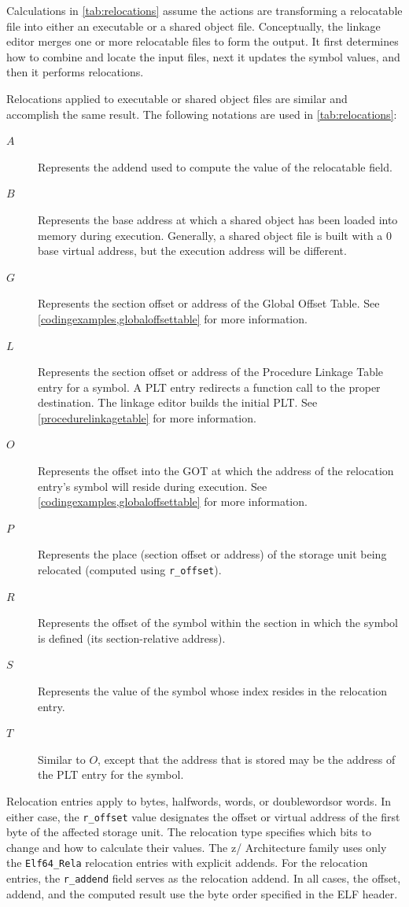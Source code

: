 \documentclass[USenglish,fontsize=11pt,twoside,%
  toc=bib,toc=idx,toc=graduated,numbers=noendperiod,
  bookmarks=true,
  bookmarksnumbered=true,
  bookmarksopen=true,
  bookmarksopenlevel=1,
  breaklinks=true,
  colorlinks=true,
  linkcolor=black,
  pdfpagelayout={TwoPageRight},
  pdfusetitle=true
]{scrreprt}
\newcommand{\NBITS}{64}
\newcommand{\ARCH}{z/\kern-1pt Ar\-chi\-tec\-ture}
\newcommand{\NBITS}{32}
\newcommand{\ARCH}{ESA/390}
\begin{document}
Calculations in \cref{tab:relocations} assume the actions are
transforming a relocatable file into either an executable or a shared
object file.  Conceptually, the linkage editor merges one or more
relocatable files to form the output.  It first determines how to
combine and locate the input files, next it updates the symbol values,
and then it performs relocations.

Relocations applied to executable or shared object files are similar
and accomplish the same result.  The following notations are used in
\cref{tab:relocations}:

\begin{description}
\item[$A$] Represents the addend used to compute the value of the
  relocatable field.
\item[$B$] Represents the base address at which a shared object has
  been loaded into memory during execution.  Generally, a shared object
  file is built with a 0 base virtual address, but the execution
  address will be different.
\item[$G$] Represents the section offset or address of the Global
  Offset Table.  See \cref{codingexamples,globaloffsettable}
  for more information.
\item[$L$] Represents the section offset or address of the Procedure
  Linkage Table entry for a symbol.  A PLT entry redirects a function
  call to the proper destination.  The linkage editor builds the
  initial PLT\@.  See \cref{procedurelinkagetable} for more
  information.
\item[$O$] Represents the offset into the GOT at which the address of
  the relocation entry's symbol will reside during execution.  See
  \cref{codingexamples,globaloffsettable} for more
  information.
\item[$P$] Represents the place (section offset or address) of the
  storage unit being relocated (computed using \texttt{r\_offset}).
\item[$R$] Represents the offset of the symbol within the section in
  which the symbol is defined (its section-relative address).
\item[$S$] Represents the value of the symbol whose index resides in
  the relocation entry.
\item[$T$] Similar to $O$, except that the address that is stored may be
  the address of the PLT entry for the symbol.
\end{description}

Relocation entries apply to bytes, halfwords, {\ifzseries words, or
  doublewords\else or words\fi}.  In either case, the \texttt{r\_offset}
value designates the offset or virtual address of the first byte of the
affected storage unit.  The relocation type specifies which bits to change
and how to calculate their values.  The \ARCH{} family uses only the
\texttt{Elf\NBITS{}\_Rela} relocation entries with explicit addends.  For
the relocation entries, the \texttt{r\_addend} field serves as the
relocation addend.  In all cases, the offset, addend, and the computed
result use the byte order specified in the ELF header.
\end{document}
